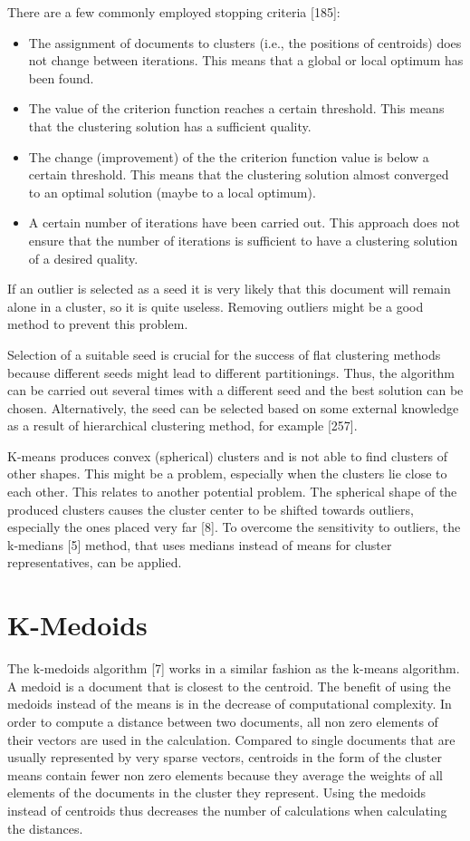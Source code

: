 \documentclass[11pt,openany,executivepaper]{book}
\begin{document}
\indent
There are a few commonly employed stopping criteria [185]:

\begin{itemize}
    \item The assignment of documents to clusters (i.e., the positions of centroids) does not change between iterations. This means that a global or local optimum has been found.
    \item The value of the criterion function reaches a certain threshold. This means that the clustering solution has a sufficient quality.
    \item The change (improvement) of the the criterion function value is below a certain threshold. This means that the clustering solution almost converged to an optimal solution (maybe to a local optimum).
    \item A certain number of iterations have been carried out. This approach does not ensure that the number of iterations is sufficient to have a clustering solution of a desired quality.
    \end{itemize}

\indent If an outlier is selected as a seed it is very likely that this document will remain alone in a cluster, so it is quite useless. Removing outliers might be a good method to prevent this problem.

 Selection of a suitable seed is crucial for the success of flat clustering methods because different seeds might lead to different partitionings. Thus, the algorithm can be carried out several times with a different seed and the best solution can be chosen. Alternatively, the seed can be selected based on some external knowledge as a result of hierarchical clustering method, for example [257].
 
K-means produces convex (spherical) clusters and is not able to find clusters of other shapes. This might be a problem, especially when the clusters lie close to each other. This relates to another potential problem. The spherical shape of the produced clusters causes the cluster center to be shifted towards outliers, especially the ones placed very far [8]. To overcome the sensitivity to outliers, the k-medians [5] method, that uses medians instead of means for cluster representatives, can be applied.

\section{K-Medoids}

The k-medoids algorithm [7] works in a similar fashion as the k-means algorithm. A medoid is a document that is closest to the centroid. The benefit of using the medoids instead of the means is in the decrease of computational complexity. In order to compute a distance between two documents, all non zero elements of their vectors are used in the calculation. Compared to single documents that are usually represented by very sparse vectors, centroids in the form of the cluster means contain fewer non zero elements because they average the weights of all elements of the documents in the cluster they represent. Using the medoids instead of centroids thus decreases the number of calculations when calculating the
distances.
\end{document}
